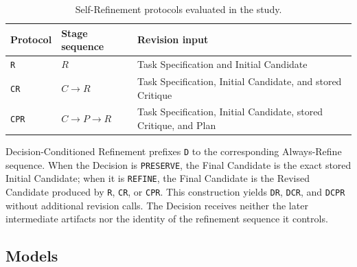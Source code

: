 \begin{table}[H]
\caption{Self-Refinement protocols evaluated in the study.}
\label{tab:protocols}
\centering
\begingroup
\small
\renewcommand{\arraystretch}{1.12}
\begin{tabularx}{0.96\columnwidth}{
    >{\centering\arraybackslash}p{}
    >{\centering\arraybackslash}p{}
    >{\raggedright\arraybackslash}X
}
\toprule
\textbf{Protocol} &
\textbf{Stage sequence} &
\textbf{Revision input} \\
\midrule
\texttt{R} & $R$ & Task Specification and Initial Candidate \\
\texttt{CR} & $C \rightarrow R$ & Task Specification, Initial Candidate, and stored Critique \\
\texttt{CPR} & $C \rightarrow P \rightarrow R$ & Task Specification, Initial Candidate, stored Critique, and Plan \\
\bottomrule
\end{tabularx}
\endgroup
\end{table}
\unskip

Decision-Conditioned Refinement prefixes \texttt{D} to the corresponding Always-Refine sequence.
When the Decision is \texttt{PRESERVE}, the Final Candidate is the exact stored Initial Candidate; when it is \texttt{REFINE}, the Final Candidate is the Revised Candidate produced by \texttt{R}, \texttt{CR}, or \texttt{CPR}.
This construction yields \texttt{DR}, \texttt{DCR}, and \texttt{DCPR} without additional revision calls.
The Decision receives neither the later intermediate artifacts nor the identity of the refinement sequence it controls.

\subsection{Models}

